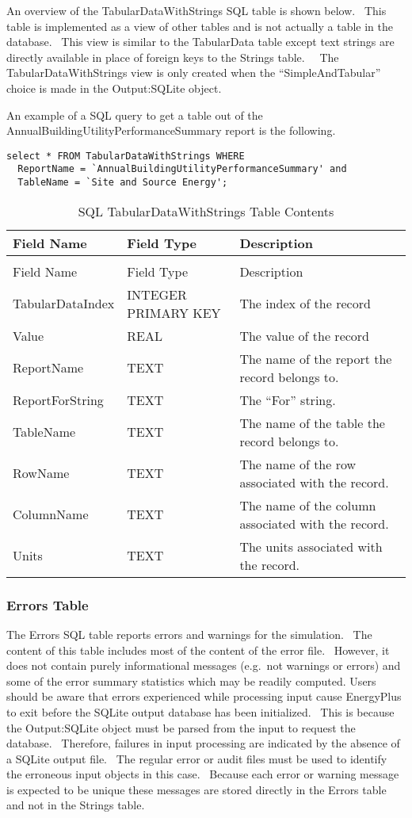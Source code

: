 An overview of the TabularDataWithStrings SQL table is shown below.  This table is implemented as a view of other tables and is not actually a table in the database.  This view is similar to the TabularData table except text strings are directly available in place of foreign keys to the Strings table.   The TabularDataWithStrings view is only created when the “SimpleAndTabular” choice is made in the Output:SQLite object.

An example of a SQL query to get a table out of the AnnualBuildingUtilityPerformanceSummary report is the following.

\begin{lstlisting}
select * FROM TabularDataWithStrings WHERE
  ReportName = `AnnualBuildingUtilityPerformanceSummary' and
  TableName = `Site and Source Energy';
\end{lstlisting}

\begin{longtable}[c]{p{1.5in}p{1.5in}p{3.0in}}
\caption{SQL TabularDataWithStrings Table Contents \label{table:table-41.-sql-tabulardatawithstrings-table}} \tabularnewline
\toprule 
Field Name & Field Type & Description \tabularnewline
\midrule
\endfirsthead

\caption[]{SQL TabularDataWithStrings Table Contents} \tabularnewline
\toprule 
Field Name & Field Type & Description \tabularnewline
\midrule
\endhead

TabularDataIndex & INTEGER PRIMARY KEY & The index of the record \tabularnewline
Value & REAL & The value of the record \tabularnewline
ReportName & TEXT & The name of the report the record belongs to. \tabularnewline
ReportForString & TEXT & The “For” string. \tabularnewline
TableName & TEXT & The name of the table the record belongs to. \tabularnewline
RowName & TEXT & The name of the row associated with the record. \tabularnewline
ColumnName & TEXT & The name of the column associated with the record. \tabularnewline
Units & TEXT & The units associated with the record. \tabularnewline
\bottomrule
\end{longtable}

\subsubsection{Errors Table}\label{errors-table}

The Errors SQL table reports errors and warnings for the simulation.~ The content of this table includes most of the content of the error file.~ However, it does not contain purely informational messages (e.g.~not warnings or errors) and some of the error summary statistics which may be readily computed. Users should be aware that errors experienced while processing input cause EnergyPlus to exit before the SQLite output database has been initialized.~ This is because the Output:SQLite object must be parsed from the input to request the database.~ Therefore, failures in input processing are indicated by the absence of a SQLite output file.~ The regular error or audit files must be used to identify the erroneous input objects in this case.~ Because each error or warning message is expected to be unique these messages are stored directly in the Errors table and not in the Strings table.

